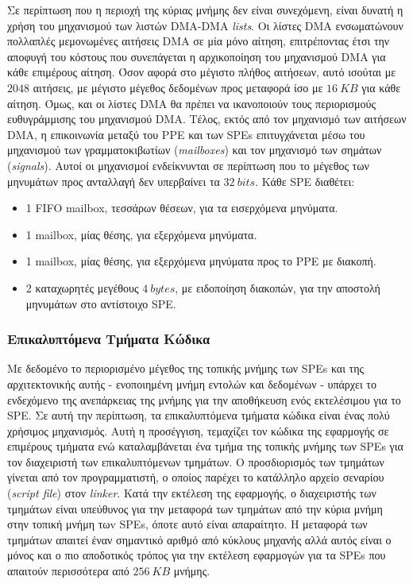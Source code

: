 Σε περίπτωση που η περιοχή της κύριας μνήμης δεν είναι συνεχόμενη, είναι δυνατή η χρήση του μηχανισμού των λιστών \ac{DMA}-\ac{DMA} \textsl{lists}. Οι λίστες \ac{DMA} ενσωματώνουν πολλαπλές μεμονωμένες αιτήσεις \ac{DMA} σε μία μόνο αίτηση, επιτρέποντας έτσι την αποφυγή του κόστους που συνεπάγεται η αρχικοποίηση του μηχανισμού \ac{DMA} για κάθε επιμέρους αίτηση. Όσον αφορά στο μέγιστο πλήθος αιτήσεων, αυτό ισούται με \(2048\) αιτήσεις, με μέγιστο μέγεθος δεδομένων προς μεταφορά ίσο με \(16\ KB\) για κάθε αίτηση. Όμως, και οι λίστες \ac{DMA} θα πρέπει να ικανοποιούν τους περιορισμούς ευθυγράμμισης του μηχανισμού \ac{DMA}.\newline \indent
Τέλος, εκτός από τον μηχανισμό των αιτήσεων \ac{DMA}, η επικοινωνία μεταξύ του \ac{PPE} και των \acp{SPE} επιτυγχάνεται μέσω του μηχανισμού των γραμματοκιβωτίων (\textsl{mailboxes}) και τον μηχανισμό των σημάτων (\textsl{signals}). Αυτοί οι μηχανισμοί ενδείκνυνται σε περίπτωση που το μέγεθος των μηνυμάτων προς ανταλλαγή δεν υπερβαίνει τα \(32\ bits\). Κάθε \ac{SPE} διαθέτει:
\begin{itemize}

\item{1 FIFO mailbox, τεσσάρων θέσεων, για τα εισερχόμενα μηνύματα.}

\item{1 mailbox, μίας θέσης, για εξερχόμενα μηνύματα.}

\item{1 mailbox, μίας θέσης, για εξερχόμενα μηνύματα προς το \ac{PPE} με διακοπή.}

\item{2 καταχωρητές μεγέθους \(4\ bytes\), με ειδοποίηση διακοπών, για την αποστολή μηνυμάτων στο αντίστοιχο \ac{SPE}.}

\end{itemize}

\subsubsection{Επικαλυπτόμενα Τμήματα Κώδικα}
\label{subsubsection:subsub3323}
\indent
Με δεδομένο το περιορισμένο μέγεθος της τοπικής μνήμης των \acp{SPE} και της αρχιτεκτονικής αυτής - ενοποιημένη μνήμη εντολών και δεδομένων - υπάρχει το ενδεχόμενο της ανεπάρκειας της μνήμης για την αποθήκευση ενός εκτελέσιμου για το \ac{SPE}. Σε αυτή την περίπτωση, τα επικαλυπτόμενα τμήματα κώδικα είναι ένας πολύ χρήσιμος μηχανισμός. Αυτή η προσέγγιση, τεμαχίζει τον κώδικα της εφαρμογής σε επιμέρους τμήματα ενώ καταλαμβάνεται ένα τμήμα της τοπικής μνήμης των \acp{SPE} για τον διαχειριστή των επικαλυπτόμενων τμημάτων. Ο προσδιορισμός των τμημάτων γίνεται από τον προγραμματιστή, ο οποίος παρέχει το κατάλληλο αρχείο σεναρίου (\textsl{script file}) στον \textsl{linker}. Κατά την εκτέλεση της εφαρμογής, ο διαχειριστής των τμημάτων είναι υπεύθυνος για την μεταφορά των τμημάτων από την κύρια μνήμη στην τοπική μνήμη τωv \acp{SPE}, όποτε αυτό είναι απαραίτητο. Η μεταφορά των τμημάτων απαιτεί έναν σημαντικό αριθμό από κύκλους μηχανής αλλά αυτός είναι ο μόνος και ο πιο αποδοτικός τρόπος για την εκτέλεση εφαρμογών για τα \acp{SPE} που απαιτούν περισσότερα από \(256\ KB\) μνήμης.

